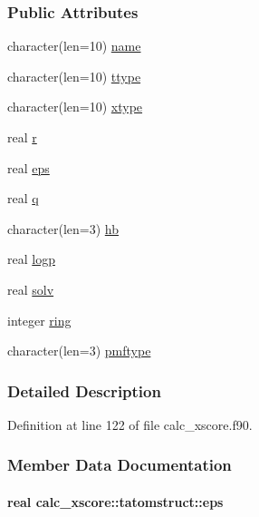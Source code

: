 \subsubsection*{Public Attributes}
\begin{DoxyCompactItemize}
\item 
character(len=10) \hyperlink{structcalc__xscore_1_1tatomstruct_a9ca731880e78fd494b3647278db68a30}{name}
\item 
character(len=10) \hyperlink{structcalc__xscore_1_1tatomstruct_aef1b094b680ec45cc2cbcbb1166a68e6}{ttype}
\item 
character(len=10) \hyperlink{structcalc__xscore_1_1tatomstruct_a11752fe6a74949aa3d8267cd1ccd5916}{xtype}
\item 
real \hyperlink{structcalc__xscore_1_1tatomstruct_a4e4e49cbc48b2be2b46cb5bbb146dbb7}{r}
\item 
real \hyperlink{structcalc__xscore_1_1tatomstruct_a7e1fddae5d2b26adc8d68ad514576633}{eps}
\item 
real \hyperlink{structcalc__xscore_1_1tatomstruct_a3a7136bc2e92e167c9701bbb3e06d509}{q}
\item 
character(len=3) \hyperlink{structcalc__xscore_1_1tatomstruct_a099d03185ba0190f15f22fd15c6070cc}{hb}
\item 
real \hyperlink{structcalc__xscore_1_1tatomstruct_aee3e2020736a98adf6f1c9812b5e0880}{logp}
\item 
real \hyperlink{structcalc__xscore_1_1tatomstruct_a682400a123f7ebb26df81b065d431252}{solv}
\item 
integer \hyperlink{structcalc__xscore_1_1tatomstruct_a44435de384f78132a7271ed4ddcc1501}{ring}
\item 
character(len=3) \hyperlink{structcalc__xscore_1_1tatomstruct_ab15ef1e2c1992fbf412b5fa2d6004eb1}{pmftype}
\end{DoxyCompactItemize}


\subsubsection{Detailed Description}


Definition at line 122 of file calc\-\_\-xscore.\-f90.



\subsubsection{Member Data Documentation}
\hypertarget{structcalc__xscore_1_1tatomstruct_a7e1fddae5d2b26adc8d68ad514576633}{
\paragraph[{eps}]{\setlength{\rightskip}{0pt plus 5cm}real calc\-\_\-xscore\-::tatomstruct\-::eps}}\label{structcalc__xscore_1_1tatomstruct_a7e1fddae5d2b26adc8d68ad514576633}


